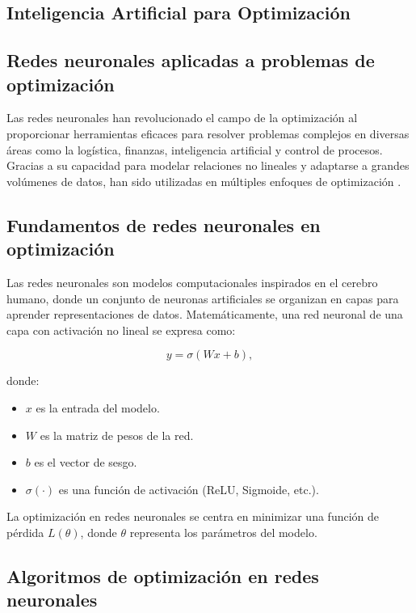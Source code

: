\begin{itemize}
		\section{Inteligencia Artificial para Optimización}
		\subsection{Redes neuronales aplicadas a problemas de optimización}
		
		Las redes neuronales han revolucionado el campo de la optimización al proporcionar herramientas eficaces para resolver problemas complejos en diversas áreas como la logística, finanzas, inteligencia artificial y control de procesos. Gracias a su capacidad para modelar relaciones no lineales y adaptarse a grandes volúmenes de datos, han sido utilizadas en múltiples enfoques de optimización \cite{lecun2015deep}.
		
		\subsection{Fundamentos de redes neuronales en optimización}
		
		Las redes neuronales son modelos computacionales inspirados en el cerebro humano, donde un conjunto de neuronas artificiales se organizan en capas para aprender representaciones de datos. Matemáticamente, una red neuronal de una capa con activación no lineal se expresa como:
		
		\begin{equation}
			y = \sigma(Wx + b),
		\end{equation}
		
		donde:
		\begin{itemize}
			\item \( x \) es la entrada del modelo.
			\item \( W \) es la matriz de pesos de la red.
			\item \( b \) es el vector de sesgo.
			\item \( \sigma(\cdot) \) es una función de activación (ReLU, Sigmoide, etc.).
		\end{itemize}
		
		La optimización en redes neuronales se centra en minimizar una función de pérdida \( L(\theta) \), donde \( \theta \) representa los parámetros del modelo.
		
		\subsection{Algoritmos de optimización en redes neuronales}
		

\end{itemize}
